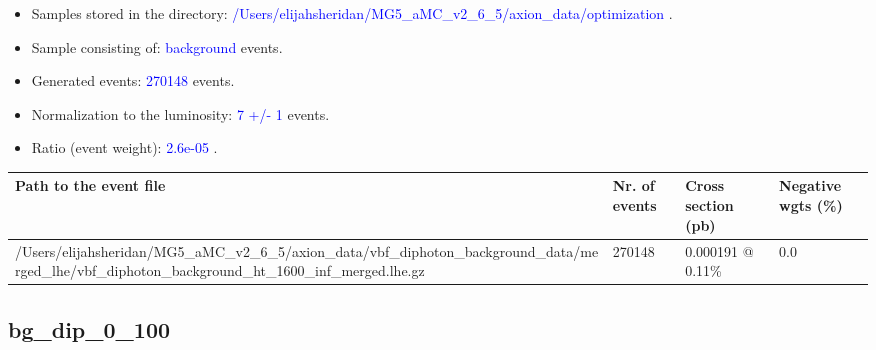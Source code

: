\documentclass[a4paper, 10pt]{article}
\begin{document}
\begin{itemize}
  \item Samples stored in the directory: \textcolor{blue}{/\-Users/\-elijahsheridan/\-MG5\_aMC\_v2\_6\_5/\-axion\_data/\-optimization} .
   \item Sample consisting of: \textcolor{blue}{background}  events.
   \item Generated events: \textcolor{blue}{270148 }  events.
   \item Normalization to the luminosity: \textcolor{blue}{7}\textcolor{blue}{ +/\-- }\textcolor{blue}{1 }  events.
   \item Ratio (event weight): \textcolor{blue}{2.6e-05 } .  
 
\end{itemize}
\begin{table}[H]
  \begin{center}
    \begin{tabular}{|m{55.0mm}|m{25.0mm}|m{30.0mm}|m{30.0mm}|}
      \hline
      {\cellcolor{yellow}         Path to the event file}& {\cellcolor{yellow}         Nr. of events}& {\cellcolor{yellow}         Cross section (pb)}& {\cellcolor{yellow}         Negative wgts (\%)}\\
      \hline
      {\cellcolor{white}          /\-Users/\-elijahsheridan/\-MG5\_aMC\_v2\_6\_5/\-axion\_data/\-vbf\_diphoton\_background\_data/\-merged\_lhe/\-vbf\_diphoton\_background\_ht\_1600\_inf\_merged.lhe.gz}& {\cellcolor{white}          270148}& {\cellcolor{white}          0.000191 @ 0.11\%}& {\cellcolor{white}          0.0}\\
\hline
    \end{tabular}
  \end{center}
\end{table}

\subsection{ bg\_dip\_0\_100}
\end{document}
